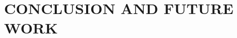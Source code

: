 ﻿\documentclass[a4paper,13pt,3p,twoside]{report}
\renewcommand{\bibname}{reference}
\theoremstyle{definition}
\begin{document}
\chapter{CONCLUSION AND FUTURE WORK} %
\label{chapter:conclusion}




\newpage
\renewcommand\bibname{REFERENCE}
\printbibliography
{}
\end{document}
